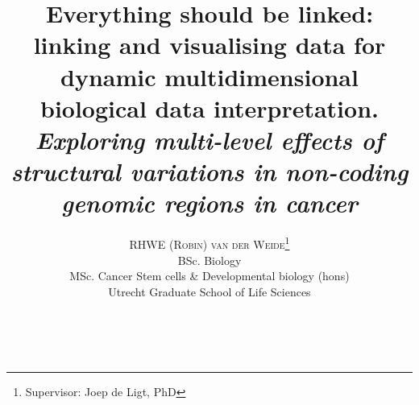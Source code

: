 \documentclass[twoside,fontsize=12pt]{article}
\title{\vspace{-15mm}\fontsize{18pt}{10pt}\normalfont\textbf{Everything should be linked: linking and visualising data for dynamic  multidimensional biological data interpretation.\\ \vspace{4 mm} {{\footnotesize \textit{Exploring multi-level effects of structural variations in non-coding genomic regions in cancer}}}}} %
\author{
\large
\textsc{RHWE (Robin) van der Weide}\thanks{Supervisor: Joep de Ligt, PhD}\\[2mm] %
\normalsize   BSc. Biology \\ %
\normalsize   MSc. Cancer Stem cells \& Developmental biology (hons)\\ %
\normalsize  Utrecht Graduate School of Life Sciences \\ %
\vspace{-5mm}
}
\date{}
\renewcommand{\abstractname}{}    %
\begin{document}
\maketitle %

\thispagestyle{fancy} %

\newpage
\mbox{   }
\newpage
\renewcommand{\abstractname}{\begin{center}
Summary of the research
\end{center}}    %
\end{document}
